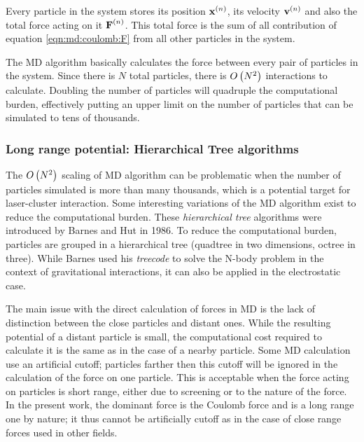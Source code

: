 Every particle in the system stores its position $\textbf{x}^{\left( n \right)}$, its velocity
$\textbf{v}^{\left( n \right)}$ and also the total force acting on it $\textbf{F}^{\left( n \right)}$. This total
force is the sum of all contribution of equation \eqref{eqn:md:coulomb:F} from
all other particles in the system.

The MD algorithm basically calculates the force between every pair of particles
in the system. Since there is $N$ total particles, there is $O\left( N^2 \right)$
interactions to calculate. Doubling the number of particles will quadruple the
computational burden, effectively putting an upper limit on the number of
particles that can be simulated to tens of thousands.

\subsubsection{Long range potential: Hierarchical Tree algorithms}
The $O\left( N^2 \right)$ scaling of MD algorithm can be problematic when the number of
particles simulated is more than many thousands, which is a potential target
for laser-cluster interaction. Some interesting variations of the MD algorithm
exist to reduce the computational burden. These \textit{hierarchical tree}
algorithms were introduced\cite{Barnes1986} by Barnes and Hut in 1986. To
reduce the computational burden, particles are grouped in a hierarchical tree
(quadtree in two dimensions, octree in three). While Barnes used his
\textit{treecode} to solve the N-body problem in the context of gravitational
interactions, it can also be applied in the electrostatic case.

The main issue with the direct calculation of forces in MD is the lack of
distinction between the close particles and distant ones. While the resulting
potential of a distant particle is small, the computational cost required to
calculate it is the same as in the case of a nearby particle. Some MD
calculation use an artificial cutoff; particles farther then this cutoff will
be ignored in the calculation of the force on one particle. This is acceptable
when the force acting on particles is short range, either due to screening or
to the nature of the force. In the present work, the dominant force is the
Coulomb force and is a long range one by nature; it thus cannot be artificially
cutoff as in the case of close range forces used in other fields.

